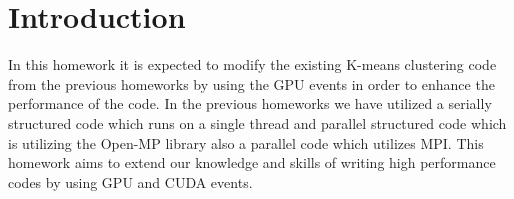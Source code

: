 \section{Introduction}
In this homework it is expected to modify the existing K-means clustering code from the previous homeworks by using the GPU events in order to enhance the performance of the code. In the previous homeworks we have utilized a serially structured code which runs on a single thread and parallel structured code which is utilizing the Open-MP library also a parallel code which utilizes MPI. This homework aims to extend our knowledge and skills of writing high performance codes by using GPU and CUDA events. 